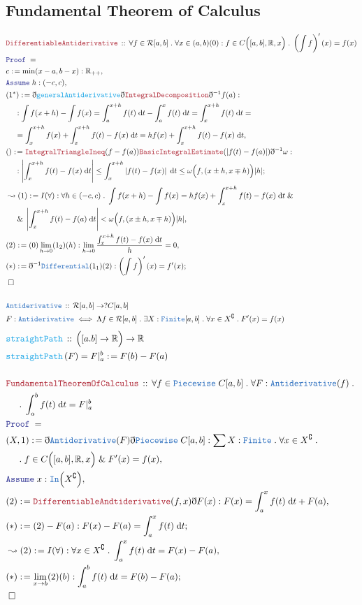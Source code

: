 \documentclass[12pt]{scrartcl}
\newcommand{\TYPE}[1]{\textcolor{NavyBlue}{\mathtt{#1}}}
\newcommand{\FUNC}[1]{\textcolor{Cerulean}{\mathtt{#1}}}
\newcommand{\LOGIC}[1]{\textcolor{Blue}{\mathtt{#1}}}
\newcommand{\THM}[1]{\textcolor{Maroon}{\mathtt{#1}}}
\renewcommand{\.}{\; . \;}
\newcommand{\de}{: \kern 0.1pc =}
\newcommand{\Act}[1]{\left( #1 \right)}
\newcommand{\Theorem}[2]{& \THM{#1} \, :: \, #2 \\ & \Proof = \\ }
\newcommand{\DeclareType}[2]{& \TYPE{#1} \, :: \, #2 \\}
\newcommand{\DefineType}[3]{& #1 : \TYPE{#2} \iff #3 \\}
\newcommand{\DeclareFunc}[2]{& \FUNC{#1} \, :: \, #2 \\}
\newcommand{\DefineNamedFunc}[4]{&  \FUNC{#1}\Act{#2} = #3 \de #4 \\}
\newcommand{\NewLine}{\\ & \kern 1pc}
\newcommand{\Page}[1]{ \begin{align*} #1 \end{align*}   }
\newcommand{ \bd }{ \ByDef }
\renewcommand{\And}{\; \& \;}
\newcommand{\Reals}{\mathbb{R} }
\renewcommand{\c}{\complement}
\newcommand{\Say}[3]{& #1 \de #2 : #3, \\}
\newcommand{\Conclude}[3]{& #1 \de #2 : #3; \\}
\newcommand{\Derive}[3]{& \leadsto #1 \de #2 : #3, \\}
\newcommand{\Assume}[2]{& \LOGIC{Assume} \;#1 : #2, \\}
\newcommand{\QED}{\; \square}
\newcommand{\EndProof}{& \QED \\}
\newcommand{\ByDef}{\eth}
\newcommand{\Proof}{\LOGIC{Proof} \; }
\begin{document}
\subsection{Fundamental Theorem of Calculus }
\Page{
	\Theorem{DifferentiableAntiderivative}{\forall f \in \mathcal{R}[a,b] \. \forall x \in (a,b)  
		(0) : f \in C\Big([a,b],\Reals, x\Big) \. \left( \int f \right)'(x) = f(x)
	}
	\Say{c}{\min(x - a,b - x)}{\Reals_{++}}
	\Assume{h}{(-c,c)}
	\Say{(1^*)}{\bd \FUNC{generalAntiderivative} \bd \THM{IntegralDecomposition} \bd^{-1} f(a)}
	{ 
		\NewLine :
		 \int f (x + h)  - \int f (x)  = 
		 \int^{x+h}_a f(t) \; \mathrm{d}t - \int^x_a f(t) \; \mathrm{d}t  =
		 \int_x^{x+h} f(t) \; \mathrm{d}t = \NewLine =
		 \int_x^{x + h} f(x) + \int_x^{x + h} f(t) - f(x) \; \mathrm{d}t 
		 =  hf(x) + \int_x^{x + h} f(t) - f(x) \; \mathrm{d}t
	}
	\Conclude{()}{  \THM{IntegralTriangleIneq}(f - f(a)) \THM{BasicIntegralEstimate}(| f(t) - f(a)|) \bd^{-1} \omega   }
	{
		\NewLine :	
		\left| \int_x^{x + h} f(t) - f(x) \; \mathrm{d}t \right| \le
		 \int_x^{x + h} \left| f(t) - f(x) \right| \; \mathrm{d}t \le
		 \omega\Big(f, (x \pm h,x \mp h) \Big)|h|  
	}
	\Derive{(1)}{I(\forall)}
	{
		\forall h \in (-c,c) \.  \int f(x + h) - \int f(x) = hf(x) + \int^{x+h}_x f(t) - f(x) \; \mathrm{d}t 
		\And \NewLine \And  \left| \int^{x+h}_x f(t) - f(a) \; \mathrm{d}t \right| < 
			\omega\Big(f, (x \pm h, x \mp h) \Big)|h|
	}
	\Say{(2)}{(0)\lim_{h \to 0} (1_2)(h)}{
		\lim_{h \to 0} \frac{\int^{x + h}_x f(t) - f(x) \; \mathrm{d}t}{h} = 0 }
	\Conclude{(*)}{\bd^{-1}\TYPE{Differential}(1_1)(2)}{\left(\int f \right)'(x) = f'(x)}
	\EndProof
	\\
	\DeclareType{Antiderivative}{ \mathcal{R}[a,b] \to ?C[a,b]  }
	\DefineType{F}{Antiderivative}{
		\Lambda f \in \mathcal{R}[a,b] \. \exists X : \TYPE{Finite}[a,b] \. 
		\forall x \in X^\c \. F'(x) = f(x)                                    	
	}
}\Page{
	\DeclareFunc{straightPath}{\Big([a.b] \to \Reals\Big) \to \Reals}
	\DefineNamedFunc{straightPath}{F}{F |^b_a}{F(b) - F(a)}
	\\
	\Theorem{FundamentalTheoremOfCalculus}
	{
		\forall f \in \TYPE{Piecewise}\; C[a,b] \. \forall F : \TYPE{Antiderivative}(f) \.
		\NewLine \.
		\int^b_a f(t) \; \mathrm{d}t = F |^b_a
	}
	\Say{(X,1)}{\bd \TYPE{Antiderivative}(F) \bd \TYPE{Piecewise} \; C[a,b]}
	{
		\sum X : \TYPE{Finite} \. \forall x \in X^\c \. 
		\NewLine \.
		f \in C\Big( [a,b],\Reals,x\Big)  
		\And  F'(x) = f(x)
	}
	\Assume{x}{ \TYPE{In}\Big(X^\c \Big)}
	\Say{(2)}{\THM{DifferentiableAndtiderivative}(f,x)\bd F(x)}
	{  F(x) = \int^x_a f(t) \; \mathrm{d}t  + F(a) }
	\Conclude{(*)}{(2) - F(a)}{F(x) - F(a) = \int^x_a f(t) \; \mathrm{d}t}
	\Derive{(2)}{I(\forall)}{
		\forall x \in X^\c \.  \int^x_a f(t) \; \mathrm{d}t = F(x) - F(a) 
	}
	\Conclude{(*)}{\lim_{x \to b} (2)(b)}{\int^b_a f(t) \; \mathrm{d}t = F(b) - F(a)}
	\EndProof
}
\newpage
\end{document}
